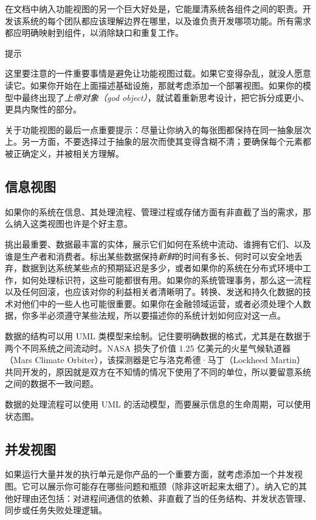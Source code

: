 在文档中纳入功能视图的另一个巨大好处是，它能厘清系统各组件之间的职责。开发该系统的每个团队都应该理解边界在哪里，以及谁负责开发哪项功能。所有需求都应明确映射到组件，以消除缺口和重复工作。

\begin{myTip}{提示}

这里要注意的一件重要事情是避免让功能视图过载。如果它变得杂乱，就没人愿意读它。如果你开始在上面描述基础设施，那就考虑添加一个部署视图。如果你的模型中最终出现了\emph{上帝对象（god object）}，就试着重新思考设计，把它拆分成更小、更具内聚性的部分。
\end{myTip}

\label{idx:225}
\label{idx:226}
关于功能视图的最后一点重要提示：尽量让你纳入的每张图都保持在同一抽象层次上。另一方面，不要选择过于抽象的层次而使其变得含糊不清；要确保每个元素都被正确定义，并被相关方理解。

\subsection{信息视图}

如果你的系统在信息、其处理流程、管理过程或存储方面有非直截了当的需求，那么纳入这类视图也许是个好主意。

\label{idx:227}
\label{idx:228}
挑出最重要、数据最丰富的实体，展示它们如何在系统中流动、谁拥有它们、以及谁是生产者和消费者。标出某些数据保持\emph{新鲜}的时间有多长、何时可以安全地丢弃，数据到达系统某些点的预期延迟是多少，或者如果你的系统在分布式环境中工作，如何处理标识符，这些可能都很有用。如果你的系统管理事务，那么这一流程以及任何回滚，也应该对你的利益相关者清晰明了。转换、发送和持久化数据的技术对他们中的一些人也可能很重要。如果你在金融领域运营，或者必须处理个人数据，你多半必须遵守某些法规，所以要描述你的系统计划如何应对这一点。

数据的结构可以用 UML 类模型来绘制。记住要明确数据的格式，尤其是在数据于两个不同系统之间流动时。NASA 损失了价值 1.25 亿美元的火星气候轨道器（Mars Climate Orbiter），该探测器是它与洛克希德·马丁（Lockheed Martin）共同开发的，原因就是双方在不知情的情况下使用了不同的单位，所以要留意系统之间的数据不一致问题。

数据的处理流程可以使用 UML 的活动模型，而要展示信息的生命周期，可以使用状态图。

\subsection{并发视图}

\label{idx:229}
\label{idx:230}
如果运行大量并发的执行单元是你产品的一个重要方面，就考虑添加一个并发视图。它可以展示你可能存在哪些问题和瓶颈（除非这听起来太细了）。纳入它的其他好理由还包括：对进程间通信的依赖、非直截了当的任务结构、并发状态管理、同步或任务失败处理逻辑。

